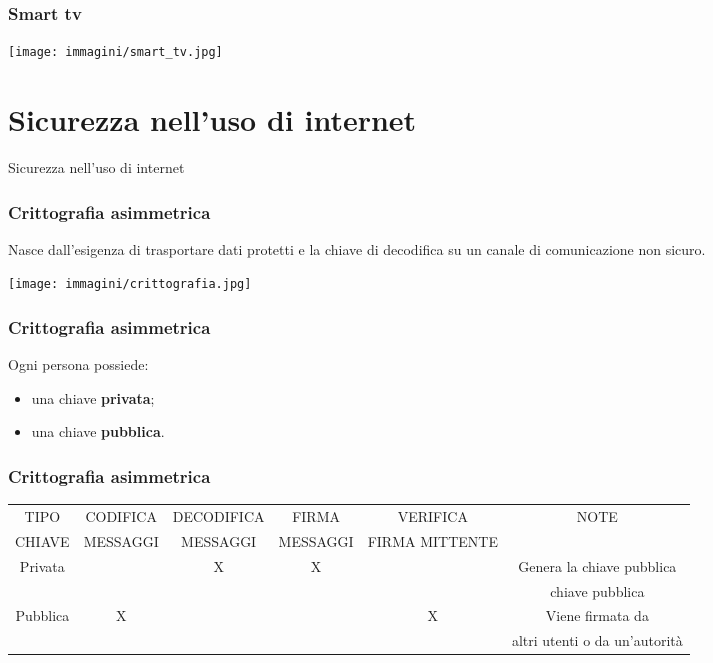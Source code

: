 \documentclass[italian,aspectratio=169]{beamer}
\begin{document}
{
\begin{frame}[plain]
\end{frame}
}



\begin{frame}
 \frametitle{Smart tv}
  \begin{center}
   \texttt{[image: immagini/smart\_tv.jpg]}
  \end{center}
\end{frame}




\section{Sicurezza nell'uso di internet}
\begin{frame}
 \begin{center}
  \huge Sicurezza nell'uso di internet
 \end{center}
\end{frame}

\begin{frame}
 \frametitle{Crittografia asimmetrica}
 Nasce dall'esigenza di trasportare dati protetti e la chiave di decodifica
 su un canale di comunicazione non sicuro.
   \begin{center}
   \texttt{[image: immagini/crittografia.jpg]}
  \end{center}
\end{frame}

\begin{frame}
 \frametitle{Crittografia asimmetrica}
 \huge Ogni persona possiede:
 \begin{itemize}
  \item una chiave \textbf{privata};
  \item una chiave \textbf{pubblica}.
 \end{itemize} 
\end{frame}

\begin{frame}
 \frametitle{Crittografia asimmetrica}
\begin{adjustbox}{max width=\textwidth}
 \begin{tabular}{|c|c|c|c|c|c|}
\hline 
{TIPO} & {CODIFICA} & {DECODIFICA} & {FIRMA} & {VERIFICA} & {NOTE}\tabularnewline
{CHIAVE}&{MESSAGGI}&{MESSAGGI}&{MESSAGGI}&{FIRMA MITTENTE}&{}\tabularnewline
\hline 
\hline 
{Privata} & {} & {X} & {X} & {} & {Genera la} chiave pubblica\tabularnewline
{} & {} & {} & {} & {} & {chiave pubblica}\tabularnewline
\hline 
{Pubblica} & {X} & {} & {} & {X} & {Viene firmata da}\tabularnewline
{} & {} & {} & {} & {} & {altri utenti o da un'autorità} \tabularnewline
\hline 
\end{tabular}
\end{adjustbox}
\end{frame}
\end{document}
